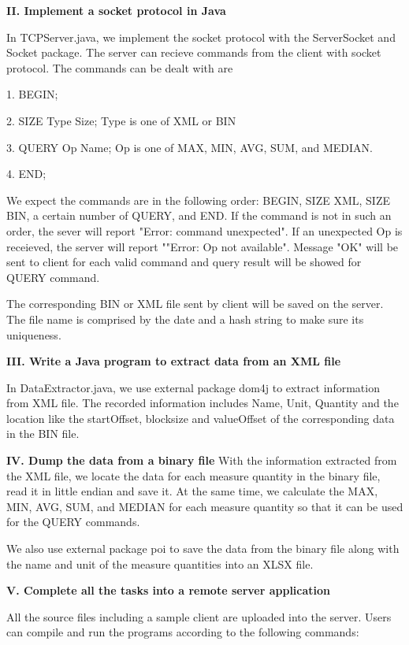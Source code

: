 \documentclass[a4paper,12pt]{article}
\begin{document}
	\noindent\textbf{II. Implement a socket protocol in Java}
	
	In TCPServer.java, we implement the socket protocol with the ServerSocket and Socket package. The server can recieve commands from the client with socket protocol. The commands can be dealt with are
	
		1. BEGIN;
		
		2. SIZE Type Size; Type is one of XML or BIN
		
		3. QUERY Op Name; Op is one of MAX, MIN, AVG, SUM, and MEDIAN.
		
		4. END;

	We expect the commands are in the following order: BEGIN, SIZE XML, SIZE BIN, a certain number of QUERY, and END. If the command is not in such an order, the sever will report "Error: command unexpected". If an unexpected Op is receieved, the server will report ""Error: Op not available". Message "OK" will be sent to client for each valid command and query result will be showed for QUERY command.
	
	The corresponding BIN or XML file sent by client will be saved on the server. The file name is comprised by the date and a hash string to make sure its uniqueness. 
	
	 
	\noindent\textbf{III. Write a Java program to extract data from an XML file}
	
	In DataExtractor.java, we use external package dom4j to extract information from XML file. The recorded information includes Name, Unit, Quantity and the location like the startOffset, blocksize and valueOffset of the corresponding data in the BIN file. 
	
	
	\noindent\textbf{IV. Dump the data from a binary file}
	With the information extracted from the XML file, we locate the data for each measure quantity in the binary file, read it in little endian and save it. At the same time, we calculate the MAX, MIN, AVG, SUM, and MEDIAN for each measure quantity so that it can be used for the QUERY commands.
	
	We also use external package poi to save the data from the binary file along with the name and unit of the measure quantities into an XLSX file.
	
	\noindent\textbf{V. Complete all the tasks into a remote server application}
	
	All the source files including a sample client are uploaded into the server. Users can compile and run the programs according to the following commands:
	
\end{document}
